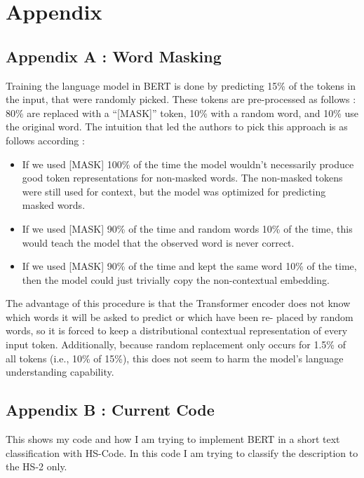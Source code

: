 \chapter{Appendix}\label{ch:data}

\section{Appendix A : Word Masking}

Training the language model in BERT is done by predicting 15{\%} of the tokens in the input, that were randomly picked. These tokens are pre-processed as follows : 80{\%} are replaced with a “[MASK]” token, 10{\%} with a random word, and 10{\%} use the original word. The intuition that led the authors to pick this approach is as follows according \citeauthor{Devlin2018} :
\begin{itemize}
 
\item If we used [MASK] 100{\%} of the time the model wouldn’t necessarily produce good token representations for non-masked words. The non-masked tokens were still used for context, but the model was optimized for predicting masked words.
\item If we used [MASK] 90{\%} of the time and random words 10{\%} of the time, this would teach the model that the observed word is never correct.
\item If we used [MASK] 90{\%} of the time and kept the same word 10{\%} of the time, then the model could just trivially copy the non-contextual embedding.
\end{itemize}

The advantage of this procedure is that the
Transformer encoder does not know which words it will be asked to predict or which have been re- placed by random words, so it is forced to keep a distributional contextual representation of every input token. Additionally, because random replacement only occurs for 1.5{\%} of all tokens (i.e., 10{\%} of 15{\%}), this does not seem to harm the model’s language understanding capability.


\section{Appendix B : Current Code}
This shows my code and how I am trying to implement BERT in a short text classification with HS-Code. In this code I am trying to classify the description to the HS-2 only.


